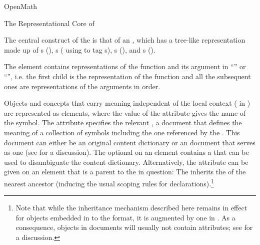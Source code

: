 \begin{omgroup}[id=mobj,short=Mathematical Objects]
\begin{omgroup}[id=openmath]{OpenMath}
\begin{module}[id=OpenMath]
\begin{omgroup}[id=om.core]{The Representational Core of {\openmath}}

\begin{definition}[id=omcore.def]
  The central construct of the {\openmath} is that of an {}, which has a tree-like representation made up of
  {s} ({}), {s}
  ({} using {} to tag
  {s}), {s} ({}), and
  {s} ({}).
\end{definition}

The {} element contains representations of the function and its
argument in ``'' or ``{}'',
i.e. the first child is the representation of the function and all the subsequent ones are
representations of the arguments in order.

\begin{omtext}
Objects and concepts that carry meaning independent of the local context ( in {\openmath}) are represented as
{} elements, where the value of the
{} attribute gives the name of the symbol.  The
{} attribute specifies the relevant {}, a document that defines the meaning of a collection of symbols including
the one referenced by the {}.  This document can either be an
original {\openmath} content dictionary or an {\omdoc} document that serves as one (see
{} for a discussion). The optional {} on
an {} element contains a {} that can be used to
disambiguate the content dictionary.  Alternatively, the {}
attribute can be given on an {\openmath} element that is a parent to the
{} in question: The {} inherits the
{} of the nearest ancestor (inducing the usual {\xml} scoping rules
for declarations).\footnote{Note that while the {} inheritance
  mechanism described here remains in effect for {\openmath} objects embedded in to the
  {\omdoc} format, it is augmented by one in {\omdoc}. As a consequence, {\openmath}
  objects in {\omdoc} documents will usually not contain {}
  attributes; see {} for a discussion.}
\end{omtext}


\end{omgroup}
\end{module}
\end{omgroup}
\end{omgroup}
